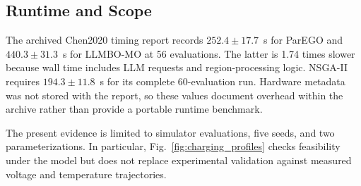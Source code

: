 \subsection{Runtime and Scope}

The archived Chen2020 timing report records
$252.4\pm17.7$~s for ParEGO and $440.3\pm31.3$~s for LLMBO-MO at 56
evaluations. The latter is 1.74 times slower because wall time includes LLM
requests and region-processing logic. NSGA-II requires
$194.3\pm11.8$~s for its complete 60-evaluation run. Hardware metadata was
not stored with the report, so these values document overhead within the
archive rather than provide a portable runtime benchmark.

The present evidence is limited to simulator evaluations, five seeds, and
two parameterizations. In particular, Fig.~\ref{fig:charging_profiles}
checks feasibility under the model but does not replace experimental
validation against measured voltage and temperature trajectories.

\clearpage
